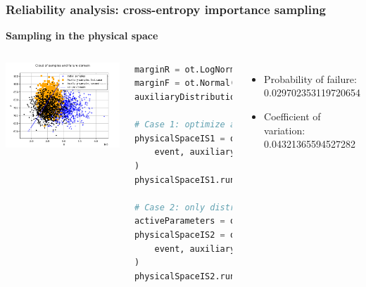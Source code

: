 \documentclass[aspectratio=169]{beamer}
\begin{document}


\begin{frame}[containsverbatim]
\frametitle{Reliability analysis: cross-entropy importance sampling}

\textbf{Sampling in the physical space}

\begin{columns}

    \includegraphics[width=1.\textwidth]{figures/CE_IS_phys.png}

    


\tiny 
\begin{lstlisting}[language=Python, numbers = none]
marginR = ot.LogNormalMuSigma().getDistribution()
marginF = ot.Normal()
auxiliaryDistribution = ot.ComposedDistribution([marginR, marginF])

# Case 1: optimize al parameters
physicalSpaceIS1 = otexp.PhysicalSpaceCrossEntropyImportanceSampling(
    event, auxiliaryDistribution, activeParameters, initialParameters, bounds
)
physicalSpaceIS1.run()

# Case 2: only distribution means are optimized
activeParameters = ot.Indices([0, 3])
physicalSpaceIS2 = otexp.PhysicalSpaceCrossEntropyImportanceSampling(
    event, auxiliaryDistribution, activeParameters, initialParameters, bounds
)
physicalSpaceIS2.run()

\end{lstlisting}

\small
\begin{itemize}
\item Probability of failure: 0.029702353119720654
\item Coefficient of variation: 0.04321365594527282
\end{itemize}

	
\end{columns}
\end{frame}
\end{document}

